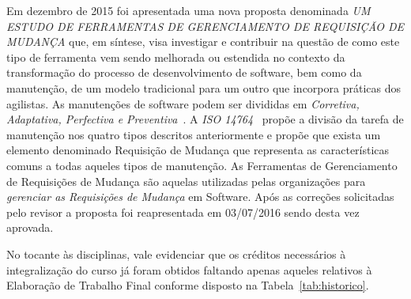 \documentclass[10pt,a4paper]{report}
\begin{document}
Em dezembro de 2015 foi apresentada uma nova proposta denominada \textit{UM
		ESTUDO DE FERRAMENTAS DE GERENCIAMENTO DE REQUISIÇÃO DE MUDANÇA} que, em
	síntese, visa investigar e contribuir na questão de como este tipo de ferramenta
	vem sendo melhorada ou estendida no contexto da transformação do processo de
	desenvolvimento de software, bem como da manutenção, de um modelo tradicional
	para um outro que incorpora práticas dos agilistas. As manutenções de software
	podem ser divididas em \textit{Corretiva, Adaptativa, Perfectiva e
		Preventiva}~\cite{Lientz:1980:SMM:601062,159342}. A \textit{ISO
		14764}~\cite{1703974} propõe a divisão da tarefa de manutenção nos quatro
	tipos descritos anteriormente e propõe que exista um elemento denominado
	Requisição de Mudança que representa as ca\-rac\-te\-rís\-ti\-cas comuns a todas
	aqueles tipos de manutenção. As Ferramentas de Gerenciamento de Requisições de
	Mudança são aquelas utilizadas pelas organizações para \textit{gerenciar as
		Requisições de Mudança}\cite{1703974} em Software. Após as correções
	solicitadas pelo revisor a proposta foi reapresentada em 03/07/2016 sendo desta
	vez aprovada.

	No tocante às disciplinas, vale evidenciar que os créditos necessários à
	integralização do curso já foram obtidos faltando apenas aqueles relativos à
	Elaboração de Trabalho Final conforme disposto na Tabela~\ref{tab:historico}.
\end{document}
